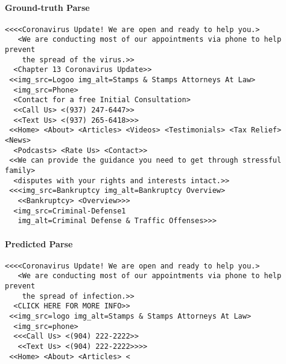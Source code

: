 \documentclass{article} \usepackage[accepted]{icml2023}
\begin{document}
\begin{figure*}
\small
\centering
{}
\begin{tcolorbox}
\paragraph{Ground-truth Parse}
\begin{verbatim}
<<<<Coronavirus Update! We are open and ready to help you.>
   <We are conducting most of our appointments via phone to help prevent 
    the spread of the virus.>>
  <Chapter 13 Coronavirus Update>> 
 <<img_src=Logoo img_alt=Stamps & Stamps Attorneys At Law>
  <img_src=Phone>
  <Contact for a free Initial Consultation> 
  <<Call Us> <(937) 247-6447>> 
  <<Text Us> <(937) 265-6418>>> 
 <<Home> <About> <Articles> <Videos> <Testimonials> <Tax Relief> <News> 
  <Podcasts> <Rate Us> <Contact>> 
 <<We can provide the guidance you need to get through stressful family> 
  <disputes with your rights and interests intact.>> 
 <<<img_src=Bankruptcy img_alt=Bankruptcy Overview>
   <<Bankruptcy> <Overview>>>
  <img_src=Criminal-Defense1
   img_alt=Criminal Defense & Traffic Offenses>>>
\end{verbatim}
\end{tcolorbox}
\begin{tcolorbox}
\paragraph{Predicted Parse}
\begin{verbatim}
<<<<Coronavirus Update! We are open and ready to help you.> 
   <We are conducting most of our appointments via phone to help prevent 
    the spread of infection.>> 
  <CLICK HERE FOR MORE INFO>> 
 <<img_src=logo img_alt=Stamps & Stamps Attorneys At Law> 
  <img_src=phone>
  <<<Call Us> <(904) 222-2222>> 
   <<Text Us> <(904) 222-2222>>>>
 <<Home> <About> <Articles> <
\end{verbatim}
\end{tcolorbox}
\end{figure*}
\end{document}
